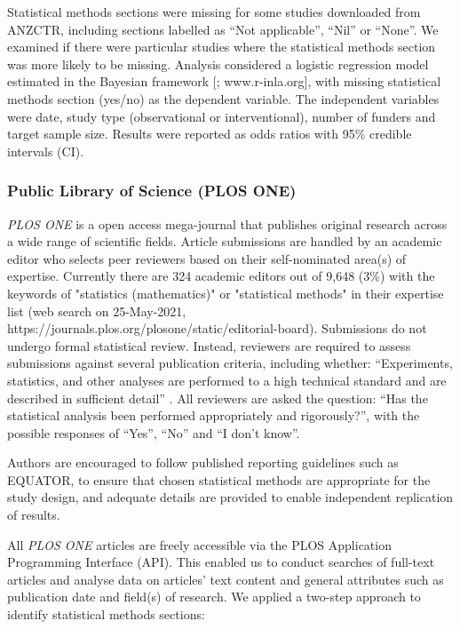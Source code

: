 \documentclass[12pt]{article}
\begin{document}
Statistical methods sections were missing for some studies downloaded
from ANZCTR, including sections labelled as ``Not
applicable'', ``Nil'' or ``None''. We examined if there were
particular studies where the statistical methods section was more likely to be missing.
Analysis considered a logistic regression model estimated in the
Bayesian framework {[}\citet{INLA}; www.r-inla.org{]}, with missing
statistical methods section (yes/no) as the dependent variable. The independent variables were date,
study type (observational or interventional), number of funders and
target sample size. Results were
reported as odds ratios with 95\% credible intervals (CI).


\subsubsection{Public Library of Science (PLOS ONE)}
\label{sec:methodsPLOS}

\emph{PLOS ONE} is a open access mega-journal that publishes original
research across a wide range of scientific fields. Article submissions
are handled by an academic editor who selects peer reviewers based on
their self-nominated area(s) of expertise. Currently there are 324 academic editors out of 9,648 (3\%) 
with the keywords of "statistics (mathematics)" or "statistical methods" in their expertise list (web search on 25-May-2021,
 https://journals.plos.org/plosone/static/editorial-board). Submissions do not undergo
formal statistical review. Instead, reviewers are required to assess
submissions against several publication criteria, including whether:
``Experiments, statistics, and other analyses are performed to a high
technical standard and are described in sufficient detail''
\citep{PLOS}. All reviewers are asked the question: ``Has the
statistical analysis been performed appropriately and rigorously?'',
with the possible responses of ``Yes'', ``No'' and ``I don't know''.

Authors are encouraged to follow published reporting guidelines such as
EQUATOR, to ensure that chosen statistical methods are appropriate for
the study design, and adequate details are provided to enable
independent replication of results.

All \emph{PLOS ONE} articles are freely accessible via the PLOS
Application Programming Interface (API). This enabled us to conduct
searches of full-text articles and analyse data on articles' text
content and general attributes such as publication date and field(s) of
research. We applied a two-step
approach to identify statistical methods sections:
\end{document}
